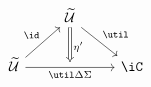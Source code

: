 \[\begin{tikzcd}
	& \Tm \\
	\Tm && \iC
	\arrow[""{name=0, anchor=center, inner sep=0}, "\util\Delta\Sigma"', from=2-1, to=2-3]
	\arrow["\id", from=2-1, to=1-2]
	\arrow["\util", from=1-2, to=2-3]
	\arrow["{\eta'}", shorten >=3pt, Rightarrow, from=1-2, to=0]
\end{tikzcd}\]